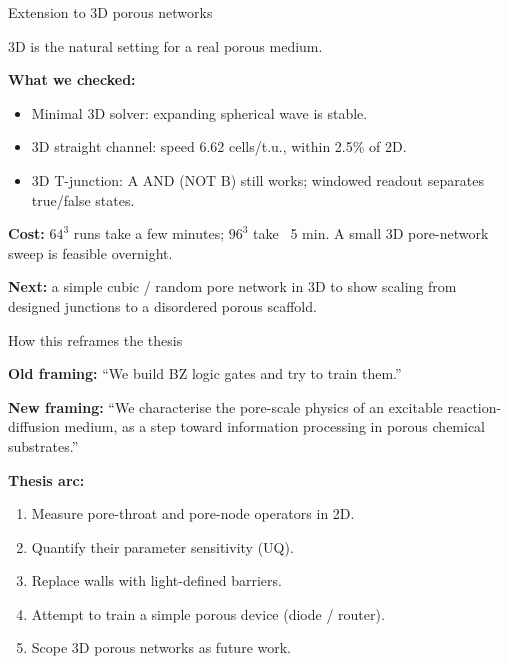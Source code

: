 \documentclass[aspectratio=169,11pt]{beamer}
\begin{document}
\begin{frame}{Extension to 3D porous networks}

3D is the natural setting for a real porous medium.

\vspace{0.3cm}
\textbf{What we checked:}
\begin{itemize}
    \item Minimal 3D solver: expanding spherical wave is stable.
    \item 3D straight channel: speed 6.62 cells/t.u., within 2.5\% of 2D.
    \item 3D T-junction: A AND (NOT B) still works; windowed readout separates true/false states.
\end{itemize}

\vspace{0.3cm}
\textbf{Cost:} $64^3$ runs take a few minutes; $96^3$ take ~5 min. A small 3D pore-network sweep is feasible overnight.

\vspace{0.3cm}
\textbf{Next:} a simple cubic / random pore network in 3D to show scaling from designed junctions to a disordered porous scaffold.

\end{frame}

\begin{frame}{How this reframes the thesis}

\textbf{Old framing:} ``We build BZ logic gates and try to train them.''

\vspace{0.3cm}
\textbf{New framing:} ``We characterise the pore-scale physics of an excitable reaction-diffusion medium, as a step toward information processing in porous chemical substrates.''

\vspace{0.4cm}
\textbf{Thesis arc:}
\begin{enumerate}
    \item Measure pore-throat and pore-node operators in 2D.
    \item Quantify their parameter sensitivity (UQ).
    \item Replace walls with light-defined barriers.
    \item Attempt to train a simple porous device (diode / router).
    \item Scope 3D porous networks as future work.
\end{enumerate}

\end{frame}
\end{document}
